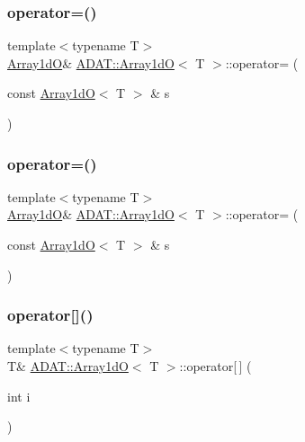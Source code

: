 \subsubsection{\texorpdfstring{operator=()}{operator=()}\hspace{0.1cm}{\footnotesize\ttfamily [1/2]}}
{\footnotesize\ttfamily template$<$typename T$>$ \\
\mbox{\hyperlink{classADAT_1_1Array1dO}{Array1dO}}\& \mbox{\hyperlink{classADAT_1_1Array1dO}{A\+D\+A\+T\+::\+Array1dO}}$<$ T $>$\+::operator= (\begin{DoxyParamCaption}\item[{const \mbox{\hyperlink{classADAT_1_1Array1dO}{Array1dO}}$<$ T $>$ \&}]{s }\end{DoxyParamCaption})\hspace{0.3cm}{\ttfamily [inline]}}

\mbox{\label{classADAT_1_1Array1dO_a387ca64e93f23d140b38bd42e81d05a8}} 
\subsubsection{\texorpdfstring{operator=()}{operator=()}\hspace{0.1cm}{\footnotesize\ttfamily [2/2]}}
{\footnotesize\ttfamily template$<$typename T$>$ \\
\mbox{\hyperlink{classADAT_1_1Array1dO}{Array1dO}}\& \mbox{\hyperlink{classADAT_1_1Array1dO}{A\+D\+A\+T\+::\+Array1dO}}$<$ T $>$\+::operator= (\begin{DoxyParamCaption}\item[{const \mbox{\hyperlink{classADAT_1_1Array1dO}{Array1dO}}$<$ T $>$ \&}]{s }\end{DoxyParamCaption})\hspace{0.3cm}{\ttfamily [inline]}}

\mbox{\label{classADAT_1_1Array1dO_a3ec54ce2ab12d922d155e37d1f63a010}} 
\subsubsection{\texorpdfstring{operator[]()}{operator[]()}\hspace{0.1cm}{\footnotesize\ttfamily [1/4]}}
{\footnotesize\ttfamily template$<$typename T$>$ \\
T\& \mbox{\hyperlink{classADAT_1_1Array1dO}{A\+D\+A\+T\+::\+Array1dO}}$<$ T $>$\+::operator\mbox{[}$\,$\mbox{]} (\begin{DoxyParamCaption}\item[{int}]{i }\end{DoxyParamCaption})\hspace{0.3cm}{\ttfamily [inline]}}



